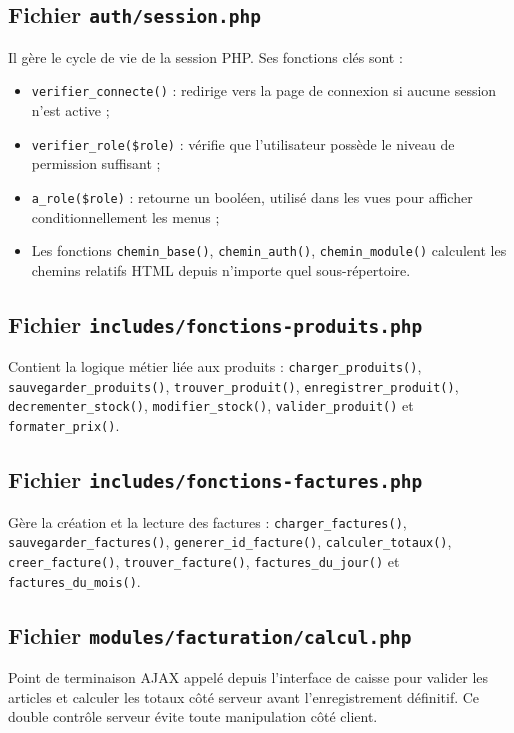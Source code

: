 \documentclass[12pt,a4paper]{report}
\begin{document}
\subsection{Fichier \texttt{auth/session.php}}
Il gère le cycle de vie de la session PHP. Ses fonctions clés sont :
\begin{itemize}
  \item \texttt{verifier\_connecte()} : redirige vers la page de connexion si aucune session n'est active ;
  \item \texttt{verifier\_role(\$role)} : vérifie que l'utilisateur possède le niveau de permission suffisant ;
  \item \texttt{a\_role(\$role)} : retourne un booléen, utilisé dans les vues pour afficher conditionnellement les menus ;
  \item Les fonctions \texttt{chemin\_base()}, \texttt{chemin\_auth()}, \texttt{chemin\_module()} calculent les chemins relatifs HTML depuis n'importe quel sous-répertoire.
\end{itemize}

\subsection{Fichier \texttt{includes/fonctions-produits.php}}
Contient la logique métier liée aux produits :
\texttt{charger\_produits()}, \texttt{sauvegarder\_produits()}, \texttt{trouver\_produit()},
\texttt{enregistrer\_produit()}, \texttt{decrementer\_stock()}, \texttt{modifier\_stock()},
\texttt{valider\_produit()} et \texttt{formater\_prix()}.

\subsection{Fichier \texttt{includes/fonctions-factures.php}}
Gère la création et la lecture des factures :
\texttt{charger\_factures()}, \texttt{sauvegarder\_factures()}, \texttt{generer\_id\_facture()},
\texttt{calculer\_totaux()}, \texttt{creer\_facture()}, \texttt{trouver\_facture()},
\texttt{factures\_du\_jour()} et \texttt{factures\_du\_mois()}.

\subsection{Fichier \texttt{modules/facturation/calcul.php}}
Point de terminaison AJAX appelé depuis l'interface de caisse pour valider les articles
et calculer les totaux côté serveur avant l'enregistrement définitif. Ce double
contrôle serveur évite toute manipulation côté client.
\end{document}
